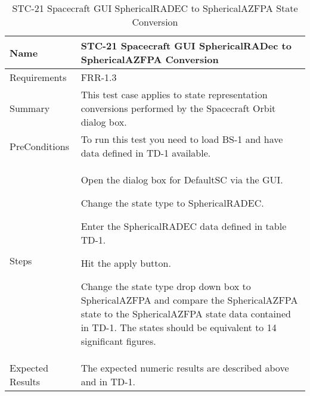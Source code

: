\begin{table}[htbp!]
\centering
      \begin{tabular}{|p{1.05 in} |p{4.75 in} |}
      \hline
         \rowcolor[rgb]{0.8,0.8,0.8} Name & STC-21 Spacecraft GUI SphericalRADec to SphericalAZFPA Conversion\\
         \hline
         Requirements & FRR-1.3\\ \hline
         Summary &
         This test case applies to state representation conversions performed by the Spacecraft Orbit dialog box.  \\
         \hline
         PreConditions & To run this test you need to load BS-1 and have data defined in TD-1 available.\\
         \hline
         Steps &
         \begin{compactenum}
         \item Open the dialog box for DefaultSC via the GUI.
         \item Change the state type to SphericalRADEC.
         \item Enter the SphericalRADEC data defined in table TD-1.
         \item Hit the apply button.
         \item Change the state type drop down box to SphericalAZFPA and compare the SphericalAZFPA state to the
         SphericalAZFPA state data contained in TD-1. The states should be equivalent to 14 significant figures.
         \end{compactenum}\\
         \hline
         Expected Results & The expected numeric results are described above and in TD-1.\\
      \hline
\end{tabular}
      \label{Table: STC-21}
      \caption{STC-21 Spacecraft GUI SphericalRADEC to SphericalAZFPA State Conversion}
\end{table} 